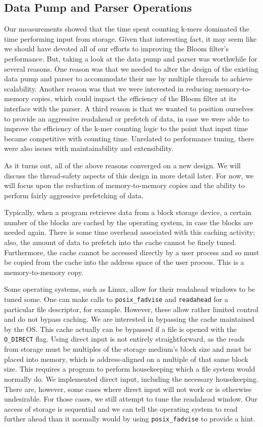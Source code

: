 \documentclass{article}
\begin{document}
\subsection{Data Pump and Parser Operations}

Our measurements showed that the time spent counting k-mers dominated the time performing input from storage. Given that interesting fact, it may seem like we should have devoted all of our efforts to improving the Bloom filter's performance. But, taking a look at the data pump and parser was worthwhile for several reasons. One reason was that we needed to alter the design of the existing data pump and parser to accommodate their use by multiple threads to achieve scalability. Another reason was that we were interested in reducing memory-to-memory copies, which could impact the efficiency of the Bloom filter at its interface with the parser. A third reason is that we wanted to position ourselves to provide an aggressive readahead or prefetch of data, in case we were able to improve the efficiency of the k-mer counting logic to the point that input time became competitive with counting time. Unrelated to performance tuning, there were also issues with maintainability and extensibility.

As it turns out, all of the above reasons converged on a new design. We will discuss the thread-safety aspects of this design in more detail later. For now, we will focus upon the reduction of memory-to-memory copies and the ability to perform fairly aggressive prefetching of data.

Typically, when a program retrieves data from a block storage device, a certain number of the blocks are cached by the operating system, in case the blocks are needed again. There is some time overhead associated with this caching activity; also, the amount of data to prefetch into the cache cannot be finely tuned. Furthermore, the cache cannot be accessed directly by a user process and so must be copied from the cache into the address space of the user process. This is a memory-to-memory copy. 

Some operating systems, such as Linux, allow for their readahead windows to be tuned some. One can make calls to \texttt{posix\_fadvise} and \texttt{readahead} for a particular file descriptor, for example. However, these allow rather limited control and do not bypass caching. We are interested in bypassing the cache maintained by the OS. This cache actually can be bypassed if a file is opened with the \texttt{O\_DIRECT} flag. Using direct input is not entirely straightforward, as the reads from storage must be multiples of the storage medium's block size and must be placed into memory, which is address-aligned on a multiple of that same block size. This requires a program to perform housekeeping which a file system would normally do. We implemented direct input, including the necessary housekeeping. There are, however, some cases where direct input will not work or is otherwise undesirable. For those cases, we still attempt to tune the readahead window. Our access of storage is sequential and we can tell the operating system to read further ahead than it normally would by using \texttt{posix\_fadvise} to provide a hint.
\end{document}
